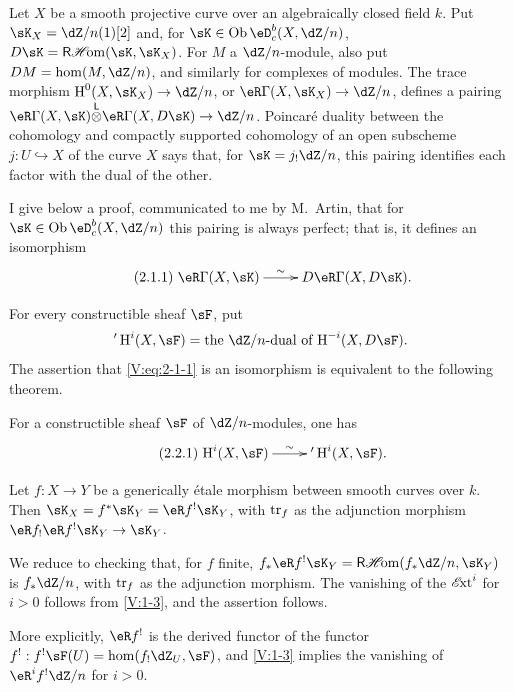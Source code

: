 Let $X$ be a smooth projective curve over an algebraically closed field $k$.
Put $\sK_X=\dZ/n(1)[2]$ and, for $\sK\in\ob \eD_c^b(X,\dZ/n)$,
$D\sK=\rHom(\sK,\sK_X)$. For $M$ a $\dZ/n$-module, also put
$D M = \hom(M,\dZ/n)$, and similarly for complexes of modules. The trace
morphism $\h^0(X,\sK_X) \to \dZ/n$, or
$\eR\Gamma(X,\sK_X)\to \dZ/n$, defines a pairing
$\eR\Gamma(X,\sK)\lotimes\eR\Gamma(X,D\sK) \to \dZ/n$. Poincaré duality
between the cohomology and compactly supported cohomology of an open
subscheme $j:U\hookrightarrow X$ of the curve $X$ says that, for
$\sK=j_!\dZ/n$, this pairing identifies each factor with the dual of the
other.

I give below a proof, communicated to me by M.\ Artin, that for
$\sK\in\ob\eD_c^b(X,\dZ/n)$ this pairing is always perfect; that is, it
defines an isomorphism
\begin{equation*}\tag{2.1.1}\label{V:eq:2-1-1}
\xymatrix{
  \eR\Gamma(X,\sK) \ar[r]^-\sim
    & D \eR\Gamma(X,D\sK) \text{.}
}
\end{equation*}

For every constructible sheaf $\sF$, put
\[
  '\h^i(X,\sF) = \text{the $\dZ/n$-dual of $\h^{-i}(X,D\sF)$.}
\]
The assertion that \eqref{V:eq:2-1-1} is an isomorphism is equivalent to the
following theorem.


\begin{theorem_}\label{V:2-2}
For a constructible sheaf $\sF$ of $\dZ/n$-modules, one has
\begin{equation*}\tag{2.2.1}\label{V:eq:2-2-1}
\xymatrix{
  \h^i(X,\sF) \ar[r]^-\sim
    & '\h^i(X,\sF) \text{.}
}
\end{equation*}
\end{theorem_}


\begin{lemma_}\label{V:2-3}
Let $f:X\to Y$ be a generically étale morphism between smooth curves over
$k$. Then $\sK_X=f^\ast\sK_Y=\eR f^!\sK_Y$, with $\operatorname{tr}_f$ as the adjunction
morphism $\eR f_!\eR f^!\sK_Y\to \sK_Y$.
\end{lemma_}

We reduce to checking that, for $f$ finite,
$f_\ast \eR f^!\sK_Y = \rHom(f_\ast\dZ/n,\sK_Y)$ is $f_\ast\dZ/n$, with
$\operatorname{tr}_f$ as the adjunction morphism. The vanishing of the $\operatorname{\mathscr{E}\!xt}^i$ for $i>0$
follows from \ref{V:1-3}, and the assertion follows.

More explicitly, $\eR f^!$ is the derived functor of the functor
$f^!:f^!\sF(U)=\hom(f_!\dZ_U,\sF)$, and \ref{V:1-3} implies the vanishing of
$\eR^i f^!\dZ/n$ for $i>0$.


